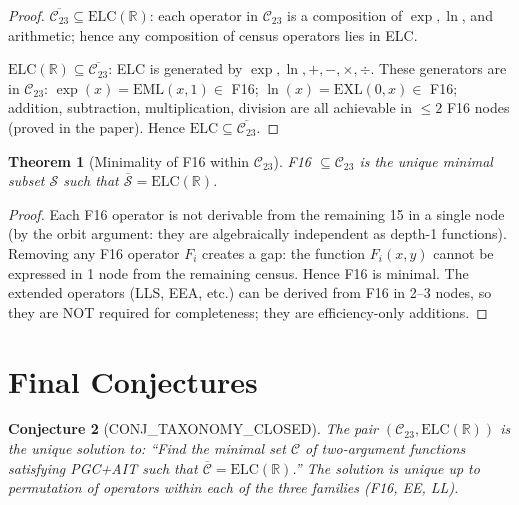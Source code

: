 \documentclass[11pt]{article}
\newtheorem{theorem}{Theorem}
\newtheorem{conjecture}[theorem]{Conjecture}
\begin{document}
\begin{proof}
$\overline{\mathcal{C}_{23}} \subseteq \mathrm{ELC}(\mathbb{R})$: each operator
in $\mathcal{C}_{23}$ is a composition of $\exp, \ln$, and arithmetic;
hence any composition of census operators lies in ELC.

$\mathrm{ELC}(\mathbb{R}) \subseteq \overline{\mathcal{C}_{23}}$:
ELC is generated by $\exp, \ln, +, -, \times, \div$.
These generators are in $\mathcal{C}_{23}$:
$\exp(x) = \mathrm{EML}(x,1) \in$ F16;
$\ln(x) = \mathrm{EXL}(0,x) \in$ F16;
addition, subtraction, multiplication, division are all achievable in $\leq 2$
F16 nodes (proved in the paper). Hence $\mathrm{ELC} \subseteq \overline{\mathcal{C}_{23}}$.
\end{proof}

\begin{theorem}[Minimality of F16 within $\mathcal{C}_{23}$]
\label{thm:minimal}
F16 $\subseteq \mathcal{C}_{23}$ is the unique minimal subset $\mathcal{S}$
such that $\overline{\mathcal{S}} = \mathrm{ELC}(\mathbb{R})$.
\end{theorem}

\begin{proof}
Each F16 operator is not derivable from the remaining 15 in a single node
(by the orbit argument: they are algebraically independent as depth-1 functions).
Removing any F16 operator $F_i$ creates a gap: the function $F_i(x,y)$ cannot
be expressed in 1 node from the remaining census. Hence F16 is minimal.
The extended operators (LLS, EEA, etc.) can be derived from F16 in 2--3 nodes,
so they are NOT required for completeness; they are efficiency-only additions.
\end{proof}

\section{Final Conjectures}
\label{sec:conjectures}

\begin{conjecture}[CONJ\_TAXONOMY\_CLOSED]
The pair $(\mathcal{C}_{23}, \mathrm{ELC}(\mathbb{R}))$ is the unique solution to:
``Find the minimal set $\mathcal{C}$ of two-argument functions satisfying PGC+AIT
such that $\overline{\mathcal{C}} = \mathrm{ELC}(\mathbb{R})$.''
The solution is unique up to permutation of operators within each of the three families
(F16, EE, LL).
\end{conjecture}
\end{document}
